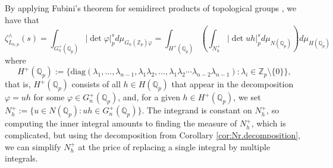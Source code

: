 \documentclass[12pt]{article}
\begin{document}
By applying Fubini's theorem for semidirect products of topological groups \cite[Proposition 28]{Nachbin}, we have that \[\zeta_{L_{n,p}}^{\wedge}(s)=\displaystyle\int_{G_{n}^{+}(\mathbb{Q}_p)}|\det{\varphi}|_p^sd\mu_{G_{n}(\mathbb{Z}_p)\varphi}=\displaystyle\int_{H^+(\mathbb{Q}_p)}\left(\displaystyle\int_{N_{h}^+}|\det{uh}|_p^sd\mu_{N(\mathbb{Q}_p)}\right)d\mu_{H(\mathbb{Q}_p)}\]
where \[H^+(\mathbb{Q}_p):=\{\mathrm{diag}(\lambda_{1},\dots,\lambda_{n-1},\lambda_{1}\lambda_{2},\dots,\lambda_{1}\lambda_{2}\cdots\lambda_{n-2}\lambda_{n-1}) : \lambda_{i}\in\mathbb{Z}_{p}\setminus\{0\}\},\]
that is, $H^+(\mathbb{Q}_p)$ consists of all $h\in{H(\mathbb{Q}_{p})}$ that appear in the decomposition $\varphi=uh$ for some $\varphi\in{G_{n}^{+}(\mathbb{Q}_{p})}$, and, for a given $h\in{H^{+}(\mathbb{Q}_{p})}$, we set $N_{h}^{+}:=\{u\in{N(\mathbb{Q}_{p}) : uh\in{G_{n}^{+}(\mathbb{Q}_{p})}}\}$. The integrand is constant on $N_{h}^{+}$, so computing the inner integral amounts to finding the measure of $N_{h}^+$, which is complicated, but using the decomposition from Corollary \ref{cor:Nr.decomposition}, we can simplify $N_{h}^{+}$ at the price of replacing a single integral by multiple integrals.
\end{document}
